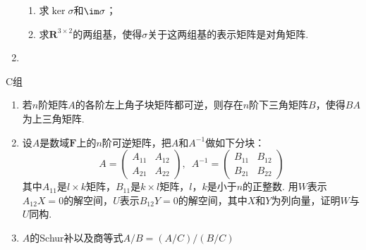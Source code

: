 \begin{enumerate}
\begin{enumerate}
              \item 求$\ker\sigma$和$\im \sigma$；

              \item 求$\mathbf{R}^{3\times 2}$的两组基，使得$\sigma$关于这两组基的表示矩阵是对角矩阵.
          \end{enumerate}

    \item %
\end{enumerate}

\centerline{\heiti C组}
\begin{enumerate}
    \item 若$n$阶矩阵$A$的各阶左上角子块矩阵都可逆，则存在$n$阶下三角矩阵$B$，使得$BA$为上三角矩阵.

    \item 设$A$是数域$\mathbf{F}$上的$n$阶可逆矩阵，把$A$和$A^{-1}$做如下分块：
          \[A=\begin{pmatrix}
                  A_{11} & A_{12} \\ A_{21} & A_{22}
              \end{pmatrix},\enspace A^{-1}=\begin{pmatrix}
                  B_{11} & B_{12} \\ B_{21} & B_{22}
              \end{pmatrix}\]
          其中$A_{11}$是$l \times k$矩阵，$B_{11}$是$k \times l$矩阵，$l$，$k$是小于$n$的正整数. 用$W$表示$A_{12}X=0$的解空间，$U$表示$B_{12}Y=0$的解空间，其中$X$和$Y$为列向量，证明$W$与$U$同构.

    \item $A$的Schur补以及商等式$A/B=(A/C)/(B/C)$%
\end{enumerate}
